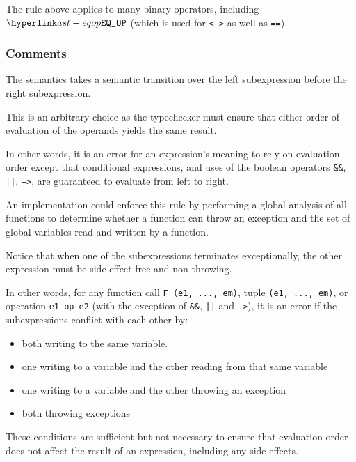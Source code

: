The rule above applies to many binary operators, including $\EQOP$ (which is used for \texttt{<->}
as well as \texttt{==}).

\subsubsection{Comments}


The semantics takes a semantic transition over the left subexpression before
the right subexpression.

This is an arbitrary choice as the typechecker must ensure that either order
of evaluation of the operands yields the same result.

In other words, it is an error for an expression’s meaning to rely on
evaluation order except that conditional expressions, and uses of the boolean
operators \texttt{\&\&}, \texttt{||}, \texttt{-->}, are guaranteed to evaluate
from left to right.


An implementation could enforce this rule by performing a global analysis of
all functions to determine whether a function can throw an exception and the
set of global variables read and written by a function.


Notice that when one of the subexpressions terminates exceptionally,
the other expression must be side effect-free and non-throwing.

In other words, for any function call \texttt{F (e1, ..., em)}, tuple
\texttt{(e1, ..., em)}, or operation \texttt{e1 op e2} (with the exception of
\texttt{\&\&}, \texttt{||} and \texttt{-->}), it is an error if the
subexpressions conflict with each other by:
\begin{itemize}
\item both writing to the same variable.
\item one writing to a variable and the other reading from that same variable
\item one writing to a variable and the other throwing an exception
\item both throwing exceptions
\end{itemize}

These conditions are sufficient but not necessary to ensure that evaluation
order does not affect the result of an expression, including any side-effects.

